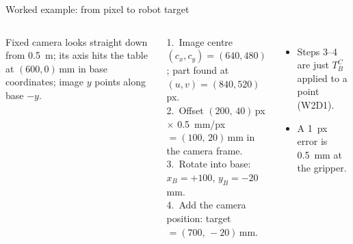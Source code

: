 \documentclass[aspectratio=169,10pt]{beamer}
\newcommand{\triad}[3]{\draw[-{Latex},mkOrange,thick] (#1) -- ++(#2:.6); \draw[-{Latex},mkBlue,thick] (#1) -- ++(#2+90:.6); \node[font=\tiny,mkNavy,anchor=north east] at (#1) {#3};}
\begin{document}
\begin{frame}{Worked example: from pixel to robot target}
\begin{columns}[T]
\centering
{}

\begin{notebox}
\small Fixed camera looks straight down from \SI{0.5}{m}; its axis hits the table at $(600,0)$\,mm in base coordinates; image $y$ points along base $-y$.
\end{notebox}
\begin{keybox}
\small
1.\ Image centre $(c_x,c_y)=(640,480)$; part found at $(u,v)=(840,520)$ px.\\[1mm]
2.\ Offset $(200,\,40)$\,px $\times$ \SI{0.5}{mm/px} $=(100,\,20)$\,mm in the camera frame.\\[1mm]
3.\ Rotate into base: $x_B=+100$, $y_B=-20$\,mm.\\[1mm]
4.\ Add the camera position: target $=(700,\,-20)$\,mm.
\end{keybox}
\begin{itemize}\small
\item Steps 3--4 are just $T_B^C$ applied to a point (W2D1).
\item A \SI{1}{px} error is \SI{0.5}{mm} at the gripper.
\end{itemize}
\end{columns}
\end{frame}
\end{document}
